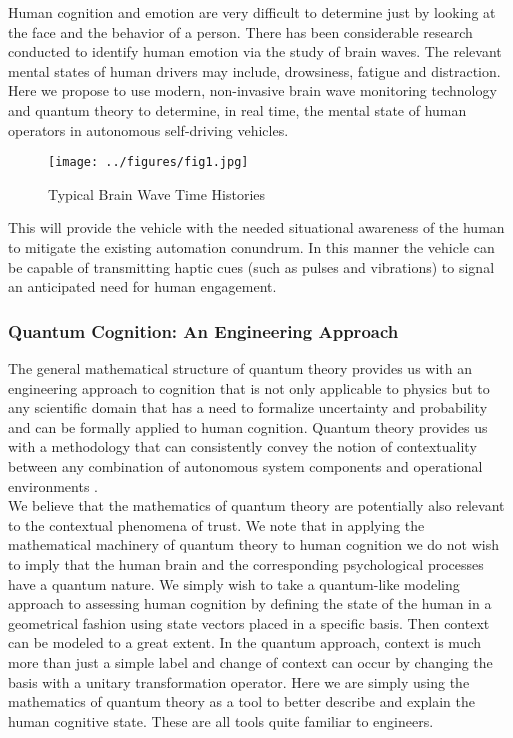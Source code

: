 Human cognition and emotion are very difficult to determine just by looking at the face and the behavior of a person. There has been considerable research conducted to identify human emotion via the study of brain waves. The relevant mental states of human drivers may include, drowsiness, fatigue and distraction. Here we propose to use modern, non-invasive brain wave monitoring technology and quantum theory to determine, in real time, the mental state of human operators in autonomous self-driving vehicles.
	\begin{figure}[h]
    \centering
    \texttt{[image: ../figures/fig1.jpg]} 
    \caption{Typical Brain Wave Time Histories}
    \end{figure}
This will provide the vehicle with the needed situational awareness of the human to mitigate the existing automation conundrum. In this manner the vehicle can be capable of transmitting haptic cues (such as pulses and vibrations) to signal an anticipated need for human engagement.

\subsubsection{Quantum Cognition: An Engineering Approach}
The general mathematical structure of quantum theory provides us with an engineering approach to cognition that is not only applicable to physics but to any scientific domain that has a need to formalize uncertainty and probability and can be formally applied to human cognition.  Quantum theory provides us with a methodology that can consistently convey the notion of contextuality between any combination of autonomous system components and operational environments \cite{Kitto2013}.\\

We believe that the mathematics of quantum theory are potentially also relevant to the contextual phenomena of trust. We note that in applying the mathematical machinery of quantum theory to human cognition we do not wish to imply that the human brain and the corresponding psychological processes have a quantum nature. We simply wish to take a quantum-like modeling approach to assessing human cognition by defining the state of the human in a geometrical fashion using state vectors placed in a specific basis. Then context can be modeled to a great extent. In the quantum approach, context is much more than just a simple label and change of context can occur by changing the basis with a unitary transformation operator. Here we are simply using the mathematics of quantum theory as a tool to better describe and explain the human cognitive state.  These are all tools quite familiar to engineers.


